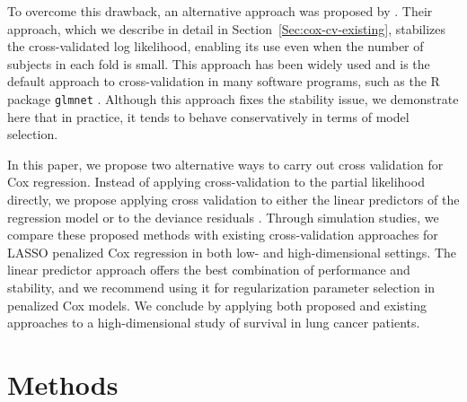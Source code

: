 \par To overcome this drawback, an alternative approach was proposed by \citet{Verweij1993}.  Their approach, which we describe in detail in Section~\ref{Sec:cox-cv-existing}, stabilizes the cross-validated log likelihood, enabling its use even when the number of subjects in each fold is small.  This approach has been widely used and is the default approach to cross-validation in many software programs, such as the R package {\tt glmnet} \citep{glmnet}.  Although this approach fixes the stability issue, we demonstrate here that in practice, it tends to behave conservatively in terms of model selection.

\par In this paper, we propose two alternative ways to carry out cross validation for Cox regression. Instead of applying cross-validation to the partial likelihood directly, we propose applying cross validation to either the linear predictors of the regression model or to the deviance residuals \citep{Therneau1990}. Through simulation studies, we compare these proposed methods with existing cross-validation approaches for LASSO penalized Cox regression in both low- and high-dimensional settings.  
The linear predictor approach offers the best combination of performance and stability, and we recommend using it for regularization parameter selection in penalized Cox models.  We conclude by applying both proposed and existing approaches to a high-dimensional study of survival in lung cancer patients.

\section{Methods}
\label{Sec:methods}

